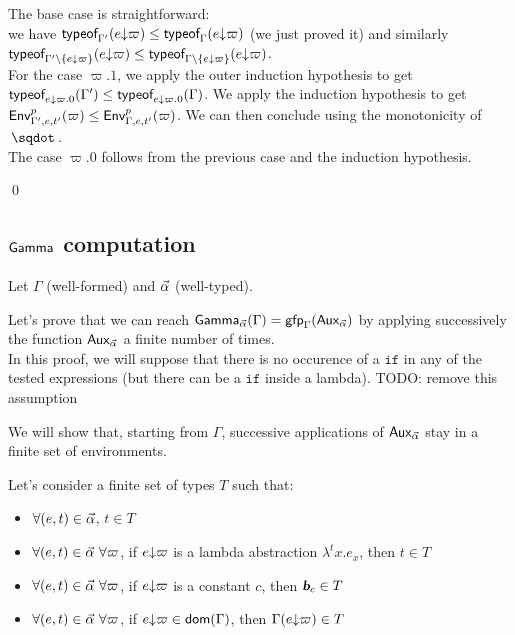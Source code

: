 \documentclass[a4paper]{article}
\theoremstyle{definition}
\begin{document}
      The base case is straightforward:\\
      we have $\tyof {\occ e \varpi} {\Gamma'} \leq \tyof {\occ e \varpi} {\Gamma}$ (we just proved it)
      and similarly $\tyof {\occ e \varpi} {\Gamma'\setminus\{\occ e \varpi\}} \leq \tyof {\occ e \varpi} {\Gamma\setminus\{\occ e \varpi\}}$.\\
      For the case $\varpi.1$, we apply the outer induction hypothesis to get $\tyof {\Gamma'} {\occ e {\varpi.0}} \leq \tyof {\Gamma} {\occ e {\varpi.0}}$.
      We apply the induction hypothesis to get $\Gp p {\Gamma',e,t'} (\varpi) \leq \Gp p {\Gamma,e,t'} (\varpi)$. We can then conclude using the monotonicity of $\worra {} {}$.\\
      The case $\varpi.0$ follows from the previous case and the induction hypothesis.
  
      \qed

    \subsection{$\Ga {}$ computation}

    Let $\Gamma$ (well-formed) and $\tenv$ (well-typed).

    Let's prove that we can reach $\Genv \tenv \Gamma=\fixpoint_\Gamma (\Gaa \tenv)$ by applying successively the function $\Gaa \tenv$ a finite number of times.\\
    In this proof, we will suppose that there is no occurence of a $\texttt{if}$ in any of the tested expressions
    (but there can be a $\texttt{if}$ inside a lambda).
    TODO: remove this assumption

    We will show that, starting from $\Gamma$, successive applications of $\Gaa \tenv$ stay in a finite set of environments.

    Let's consider a finite set of types $T$ such that:
    \begin{itemize}
      \item $\forall (e,t) \in \tenv$, $t \in T$
      \item $\forall (e,t) \in \tenv\ \forall \varpi$, if $\occ e \varpi$ is a lambda abstraction $\lambda^tx.e_x$, then $t \in T$
      \item $\forall (e,t) \in \tenv\ \forall \varpi$, if $\occ e \varpi$ is a constant $c$, then $\basic{c} \in T$
      \item $\forall (e,t) \in \tenv\ \forall \varpi$, if $\occ e \varpi \in \dom \Gamma$, then $\Gamma(\occ e \varpi) \in T$
    \end{itemize}
\end{document}
